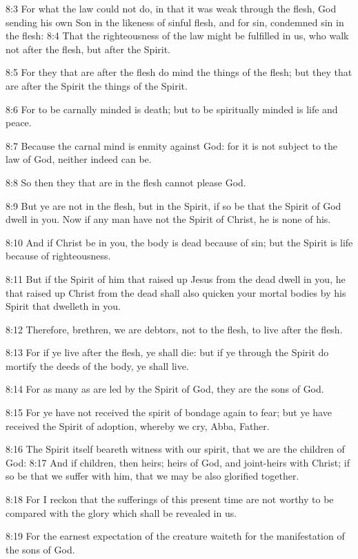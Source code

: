 8:3 For what the law could not do, in that it was weak through the flesh, God sending his own Son in the likeness of sinful flesh, and for sin, condemned sin in the flesh: 8:4 That the righteousness of the law might be fulfilled in us, who walk not after the flesh, but after the Spirit.

8:5 For they that are after the flesh do mind the things of the flesh; but they that are after the Spirit the things of the Spirit.

8:6 For to be carnally minded is death; but to be spiritually minded is life and peace.

8:7 Because the carnal mind is enmity against God: for it is not subject to the law of God, neither indeed can be.

8:8 So then they that are in the flesh cannot please God.

8:9 But ye are not in the flesh, but in the Spirit, if so be that the Spirit of God dwell in you. Now if any man have not the Spirit of Christ, he is none of his.

8:10 And if Christ be in you, the body is dead because of sin; but the Spirit is life because of righteousness.

8:11 But if the Spirit of him that raised up Jesus from the dead dwell in you, he that raised up Christ from the dead shall also quicken your mortal bodies by his Spirit that dwelleth in you.

8:12 Therefore, brethren, we are debtors, not to the flesh, to live after the flesh.

8:13 For if ye live after the flesh, ye shall die: but if ye through the Spirit do mortify the deeds of the body, ye shall live.

8:14 For as many as are led by the Spirit of God, they are the sons of God.

8:15 For ye have not received the spirit of bondage again to fear; but ye have received the Spirit of adoption, whereby we cry, Abba, Father.

8:16 The Spirit itself beareth witness with our spirit, that we are the children of God: 8:17 And if children, then heirs; heirs of God, and joint-heirs with Christ; if so be that we suffer with him, that we may be also glorified together.

8:18 For I reckon that the sufferings of this present time are not worthy to be compared with the glory which shall be revealed in us.

8:19 For the earnest expectation of the creature waiteth for the manifestation of the sons of God.

